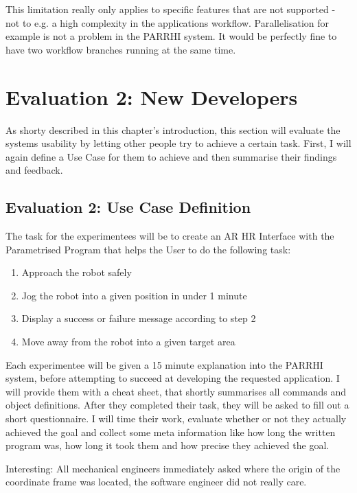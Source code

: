 This limitation really only applies to specific features that are not supported - not to e.g. a high complexity in the applications workflow. Parallelisation for example is not a problem in the PARRHI system. It would be perfectly fine to have two workflow branches running at the same time. 

\section{Evaluation 2: New Developers}
As shorty described in this chapter's introduction, this section will evaluate the systems usability by letting other people try to achieve a certain task. First, I will again define a Use Case for them to achieve and then summarise their findings and feedback.

\subsection{Evaluation 2: Use Case Definition}
The task for the experimentees will be to create an AR HR Interface with the Parametrised Program that helps the User to do the following task:
\begin{enumerate}
	\item Approach the robot safely
	\item Jog the robot into a given position in under 1 minute
	\item Display a success or failure message according to step 2
	\item Move away from the robot into a given target area
\end{enumerate} 

Each experimentee will be given a 15 minute explanation into the PARRHI system, before attempting to succeed at developing the requested application. I will provide them with a cheat sheet, that shortly summarises all commands and object definitions. After they completed their task, they will be asked to fill out a short questionnaire. I will time their work, evaluate whether or not they actually achieved the goal and collect some meta information like how long the written program was, how long it took them and how precise they achieved the goal.

Interesting: All mechanical engineers immediately
 asked where the origin of the coordinate frame was located, the software engineer did not really care.